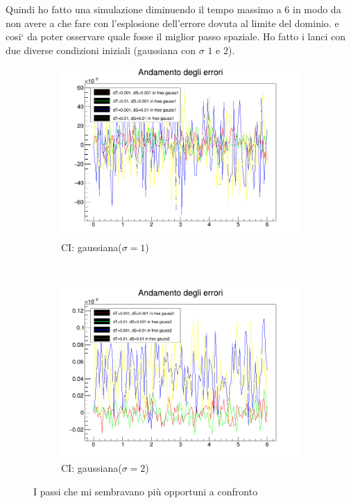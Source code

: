 Quindi ho fatto una simulazione diminuendo il tempo massimo a $6$ in modo da non avere a che fare con l'esplosione dell'errore dovuta al limite del dominio. e cosi` da poter osservare quale fosse il miglior passo spaziale. Ho fatto i lanci con due diverse condizioni iniziali (gaussiana con $\sigma$ $1$ e $2$). 

\begin{figure}[htb]
  \centering
  \begin{subfigure}[b]{0.45\textwidth}
    \includegraphics[width=\textwidth]{IMG/eChoosy1}
    \caption{CI: gaussiana($\sigma=1$)}
  \end{subfigure}
  ~
  \begin{subfigure}[b]{0.45\textwidth}
    \includegraphics[width=\textwidth]{IMG/eChoosy2}
    \caption{CI: gaussiana($\sigma=2$)}
  \end{subfigure}
  \caption{I passi che mi sembravano pi\`u opportuni a confronto}\label{fig:SceltaErrori}
\end{figure}

